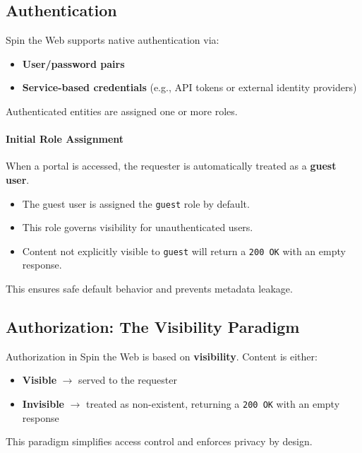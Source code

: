 \subsection{Authentication}

Spin the Web supports native authentication via:

\begin{itemize}
	\item \textbf{User/password pairs}
	\item \textbf{Service-based credentials} (e.g., API tokens or external identity providers)
\end{itemize}

Authenticated entities are assigned one or more roles.

\paragraph{Initial Role Assignment}
When a portal is accessed, the requester is automatically treated as a \textbf{guest user}.

\begin{itemize}
	\item The guest user is assigned the \texttt{guest} role by default.
	\item This role governs visibility for unauthenticated users.
	\item Content not explicitly visible to \texttt{guest} will return a \texttt{200 OK} with an empty response.
\end{itemize}

This ensures safe default behavior and prevents metadata leakage.

\subsection{Authorization: The Visibility Paradigm}

Authorization in Spin the Web is based on \textbf{visibility}. Content is either:

\begin{itemize}
	\item \textbf{Visible} $\to$ served to the requester
	\item \textbf{Invisible} $\to$ treated as non-existent, returning a \texttt{200 OK} with an empty response
\end{itemize}

This paradigm simplifies access control and enforces privacy by design.

